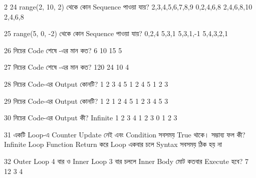 \begin{multicols}{2}
\mcqwide
{24}
{\textenglish{\ttfamily range(2, 10, 2)} থেকে কোন Sequence পাওয়া যায়?}
{2,3,4,5,6,7,8,9}
{0,2,4,6,8}
{2,4,6,8,10}
{2,4,6,8}

\mcqwide
{25}
{\textenglish{\ttfamily range(5, 0, -2)} থেকে কোন Sequence পাওয়া যায়?}
{0,2,4}
{5,3,1}
{5,3,1,-1}
{5,4,3,2,1}

\mcqwide
{26}
{নিচের Code শেষে -এর মান কত?}
{6}
{10}
{15}
{5}

\mcqwide
{27}
{নিচের Code শেষে -এর মান কত?}
{120}
{24}
{10}
{4}

\mcqwide
{28}
{নিচের Code-এর Output কোনটি?}
{1 2}
{3 4 5}
{1 2 4 5}
{1 2 3}

\mcqwide
{29}
{নিচের Code-এর Output কোনটি?}
{1 2}
{1 2 4 5}
{1 2 3 4 5}
{3}

\mcqwide
{30}
{নিচের Code-এর Output কী?}
{Infinite}
{1 2 3 4}
{1 2 3}
{0 1 2 3}

\mcq
{31}
{একটি  Loop-এ Counter Update নেই এবং Condition সবসময় True থাকে। সম্ভাব্য ফল কী?}
{Infinite Loop}
{Function Return করে}
{Loop একবার চলে}
{Syntax সবসময় ঠিক হয় না}

\mcq
{32}
{Outer Loop 4 বার ও Inner Loop 3 বার চললে Inner Body মোট কতবার Execute হবে?}
{7}
{12}
{3}
{4}


\end{multicols}
